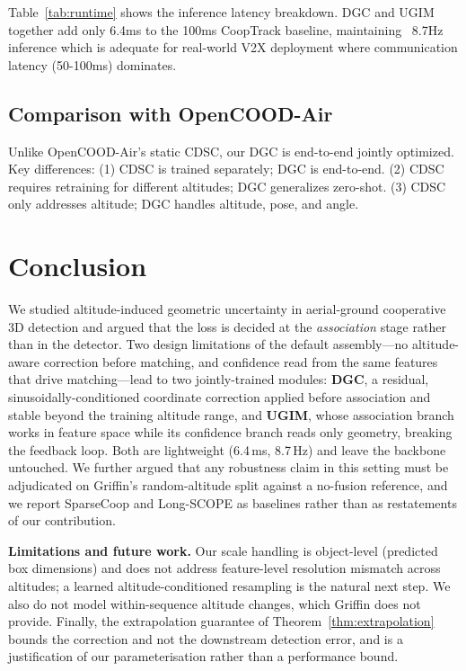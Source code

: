 \documentclass[9.5pt,twocolumn,a4paper]{IEEEtran}
\begin{document}
Table~\ref{tab:runtime} shows the inference latency breakdown. DGC and UGIM together add only 6.4ms to the 100ms CoopTrack baseline, maintaining ~8.7Hz inference which is adequate for real-world V2X deployment where communication latency (50-100ms) dominates.

\subsection{Comparison with OpenCOOD-Air}

Unlike OpenCOOD-Air's static CDSC, our DGC is end-to-end jointly optimized. Key differences: (1) CDSC is trained separately; DGC is end-to-end. (2) CDSC requires retraining for different altitudes; DGC generalizes zero-shot. (3) CDSC only addresses altitude; DGC handles altitude, pose, and angle.

\section{Conclusion}
\label{sec:conclusion}

We studied altitude-induced geometric uncertainty in aerial-ground cooperative 3D detection and argued that the loss is decided at the \emph{association} stage rather than in the detector. Two design limitations of the default assembly---no altitude-aware correction before matching, and confidence read from the same features that drive matching---lead to two jointly-trained modules: \textbf{DGC}, a residual, sinusoidally-conditioned coordinate correction applied before association and stable beyond the training altitude range, and \textbf{UGIM}, whose association branch works in feature space while its confidence branch reads only geometry, breaking the feedback loop. Both are lightweight (6.4\,ms, 8.7\,Hz) and leave the backbone untouched. We further argued that any robustness claim in this setting must be adjudicated on Griffin's random-altitude split against a no-fusion reference, and we report SparseCoop and Long-SCOPE as baselines rather than as restatements of our contribution.

\noindent\textbf{Limitations and future work.} Our scale handling is object-level (predicted box dimensions) and does not address feature-level resolution mismatch across altitudes; a learned altitude-conditioned resampling is the natural next step. We also do not model within-sequence altitude changes, which Griffin does not provide. Finally, the extrapolation guarantee of Theorem~\ref{thm:extrapolation} bounds the correction and not the downstream detection error, and is a justification of our parameterisation rather than a performance bound.
\end{document}
